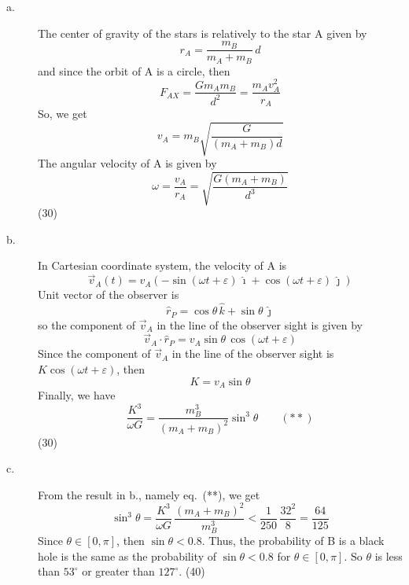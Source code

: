 \begin{description}
\item[a.] The center of gravity of the stars is relatively to the star A given
  by
  \[ r_A = \frac{m_B}{m_A + m_B}\,d \]
  and since the orbit of A is a circle, then
  \[ F_{AX} = \frac{G m_A m_B}{d^2} = \frac{m_A v_A^2}{r_A} \]
  So, we get
  \[ v_A = m_B\sqrt{\frac{G}{(m_A + m_B)d}} \]
  The angular velocity of A is given by
  \[ \omega = \frac{v_A}{r_A} = \sqrt{\frac{G(m_A + m_B)}{d^3}} \]
  \hfill(30)
\item[b.] In Cartesian coordinate system, the velocity of A is
  \[ \vec{v}_A(t) = v_A\left(-\sin(\omega t + \varepsilon)\,\hat{\imath}
     + \cos(\omega t + \varepsilon)\,\hat{\jmath}\right) \]
  Unit vector of the observer is
  \[ \hat{r}_P = \cos\theta\,\hat{k} + \sin\theta\,\hat{\jmath} \]
  so the component of $\vec{v}_A$ in the line of the observer sight is given
  by
  \[ \vec{v}_A\cdot\hat{r}_P = v_A\sin\theta\,\cos(\omega t + \varepsilon) \]
  Since the component of $\vec{v}_A$ in the line of the observer sight is
  $K\cos(\omega t + \varepsilon)$, then
  \[ K = v_A\sin\theta \]
  Finally, we have
  \[ \frac{K^3}{\omega G} = \frac{m_B^3}{(m_A + m_B)^2}\sin^3\theta
     \qquad (**) \]
  \hfill(30)
\item[c.] From the result in b., namely eq.\ (**), we get
  \[ \sin^3\theta = \frac{K^3}{\omega G}\,
     \frac{(m_A + m_B)^2}{m_B^3}
     < \frac{1}{250}\,\frac{32^2}{8} = \frac{64}{125} \]
  Since $\theta \in [0, \pi]$, then $\sin\theta < 0.8$. Thus, the probability
  of B is a black hole is the same as the probability of $\sin\theta < 0.8$
  for $\theta \in [0, \pi]$. So $\theta$ is less than $53^\circ$ or greater
  than $127^\circ$.
  \hfill(40)
\end{description}

